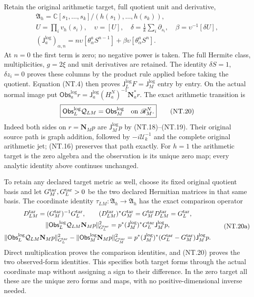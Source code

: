 Retain the original arithmetic target, full quotient unit and derivative,
\[
 \begin{gathered}
 \mathfrak A_h=\mathbb C[s_1,\ldots,s_k]/(h(s_1),\ldots,h(s_k)),\\
 U=\prod_i v_h(s_i),\quad \upsilon=[U],\quad
 \delta=\frac1k\sum_i\partial_{s_i},\quad
 \beta=\upsilon^{-1}[\delta U],\\
 (\mathsf J_a^{\log})_{\alpha,n}
  =n\upsilon[\theta^a_\alpha S^{n-1}]
        +\beta\upsilon[\theta^a_\alpha S^n].
 \end{gathered}
 \tag{NT.19}
\]
At $n=0$ the first term is zero; no negative power is taken.
The full Hermite class, multiplicities, $g=2\xi$ and unit derivatives
are retained. The identity $\delta S=1$, $\delta z_i=0$ proves
these columns by the product rule applied before taking the quotient.
Equation (NT.4) then proves
$\mathsf J_L^{\log}F=\mathsf J_M^{\log}$ entry by entry.
On the actual normal image put
$\mathsf{Obs}_a^{\log}r=
\mathsf J_a^{\log}(H_a^N)^{-1}\mathbf N_a^*r$.
The exact arithmetic transition is
\[
 \boxed{\mathsf{Obs}_L^{\log}\mathcal Q_{LM}
              =\mathsf{Obs}_M^{\log}
                 \quad\hbox{on }\mathscr R_M^N.}
 \tag{NT.20}
\]
Indeed both sides on $r=\mathbf N_Mp$ are
$\mathsf J_M^{\log}p$ by (NT.18)--(NT.19).
Their original source path is graph addition, followed by
$-i\mathscr U_k^{-1}$ and the complete original arithmetic jet;
(NT.16) preserves that path exactly. For $h=1$ the arithmetic
target is the zero algebra and the observation is its unique zero
map; every analytic identity above continues unchanged.

To retain any declared target metric as well, choose its fixed
original quotient basis and let $G_M^{\rm tar},G_L^{\rm tar}>0$
be the two declared Hermitian matrices in that same basis. The
coordinate identity $\tau_{LM}:\mathfrak A_h\to\mathfrak A_h$
has the exact comparison operator
\[
 \begin{gathered}
 D_{LM}^{\rm tar}=(G_M^{\rm tar})^{-1}G_L^{\rm tar},\qquad
 (D_{LM}^{\rm tar})^*G_M^{\rm tar}
       =G_M^{\rm tar}D_{LM}^{\rm tar}=G_L^{\rm tar},\\
 \|\mathsf{Obs}_L^{\log}\mathcal Q_{LM}\mathbf N_Mp\|_{G_L^{\rm tar}}^2
    =p^*(\mathsf J_M^{\log})^*G_L^{\rm tar}\mathsf J_M^{\log}p,\\
 \|\mathsf{Obs}_L^{\log}\mathcal Q_{LM}\mathbf N_Mp\|_{G_L^{\rm tar}}^2
  -\|\mathsf{Obs}_M^{\log}\mathbf N_Mp\|_{G_M^{\rm tar}}^2
    =p^*(\mathsf J_M^{\log})^*(G_L^{\rm tar}-G_M^{\rm tar})
                                     \mathsf J_M^{\log}p.
 \end{gathered}
 \tag{NT.20a}
\]
Direct multiplication proves the comparison identities, and (NT.20)
proves the two observed-form identities. This specifies both target
forms through the actual coordinate map without assigning a sign
to their difference. In the zero target all these are the unique
zero forms and maps, with no positive-dimensional inverse needed.

